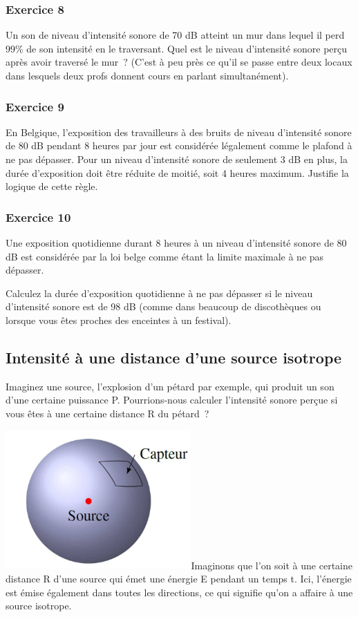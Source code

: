 \subsubsection*{Exercice 8}
Un son de niveau d'intensité sonore de 70 dB atteint un mur dans
lequel il perd 99\% de son intensité en le traversant. Quel est le
niveau d'intensité sonore perçu après avoir traversé le mur~? (C'est à
peu près ce qu'il se passe entre deux locaux dans lesquels deux profs
donnent cours en parlant simultanément).

\subsubsection*{Exercice 9}
En Belgique, l'exposition des travailleurs à des bruits de niveau
d'intensité sonore de 80 dB pendant 8 heures par jour est considérée
légalement comme le plafond à ne pas dépasser. Pour un niveau
d'intensité sonore de seulement 3 dB en plus, la durée d'exposition doit
être réduite de moitié, soit 4 heures maximum. Justifie la logique de
cette règle.

\subsubsection*{Exercice 10}
Une exposition quotidienne durant 8 heures à un niveau d'intensité
sonore de 80 dB est considérée par la loi belge comme étant la limite
maximale à ne pas dépasser.

Calculez la durée d'exposition quotidienne à ne pas dépasser si le
niveau d'intensité sonore est de 98 dB (comme dans beaucoup de
discothèques ou lorsque vous êtes proches des enceintes à un festival).

\subsection{Intensité à une distance  d'une
source isotrope }

Imaginez une source, l'explosion d'un pétard par exemple, qui produit un
son d'une certaine puissance P. Pourrions-nous calculer l'intensité
sonore perçue si vous êtes à une certaine distance R du pétard~?

\includegraphics[width=7.103cm,height=5.315cm]{Pictures/100000010000018C00000128C1F2235D9C61A7FD.png}Imaginons
que l'on soit à une certaine distance R d'une source qui émet une
énergie E pendant un temps t. Ici, l'énergie est émise également dans
toutes les directions, ce qui signifie qu'on a affaire à une source
isotrope.


